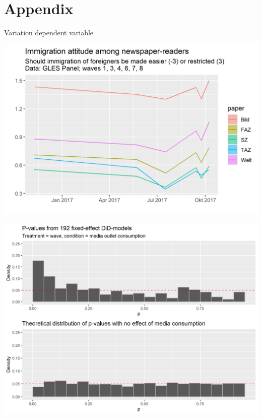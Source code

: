 \documentclass[
  ignorenonframetext,
]{beamer}
\begin{document}
\hypertarget{appendix}{%
\section{Appendix}\label{appendix}}

\begin{frame}[allowframebreaks]{Variation dependent variable}
\protect\hypertarget{variation-dependent-variable}{}
\centering

\includegraphics{vis/imm_readers_pres.png}

\framebreak

\centering

\includegraphics{vis/DiD_model_ps_immint.png}
\end{frame}
\end{document}
